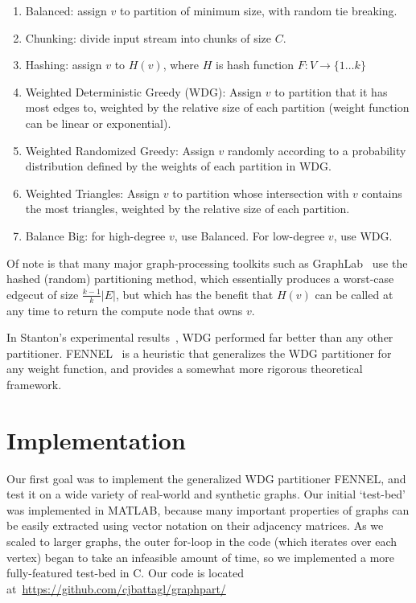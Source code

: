 \documentclass[11pt]{article}
\begin{document}
\begin{enumerate}
\item Balanced: assign $v$ to partition of minimum size, with random tie breaking.
\item Chunking: divide input stream into chunks of size $C$.
\item Hashing: assign $v$ to $H(v)$, where $H$ is hash function $F:V\to\{1\dots k\}$
\item Weighted Deterministic Greedy (WDG): Assign $v$ to partition that it has most edges to, weighted by the relative size of each partition (weight function can be linear or exponential).
\item Weighted Randomized Greedy: Assign $v$ randomly according to a probability distribution defined by the weights of each partition in WDG.
\item Weighted Triangles: Assign $v$ to partition whose intersection with $v$ contains the most triangles, weighted by the relative size of each partition.
\item Balance Big: for high-degree $v$, use Balanced. For low-degree $v$, use WDG. 
\end{enumerate}

Of note is that many major graph-processing toolkits such as GraphLab~\cite{Low:2012:DGF:2212351.2212354} use the hashed (random) partitioning method, which essentially produces a worst-case edgecut of size $\frac{k-1}{k}|E|$, but which has the benefit that $H(v)$ can be called at any time to return the compute node that owns $v$. 

In Stanton's experimental results~\cite{Stanton:2012:SGP:2339530.2339722}, WDG performed far better than any other partitioner. FENNEL~\cite{tsourakakis2012fennel} is a heuristic that generalizes the WDG partitioner for any weight function, and provides a somewhat more rigorous theoretical framework. 


\section{Implementation}
Our first goal was to implement the generalized WDG partitioner FENNEL, and test it on a wide variety of real-world and synthetic graphs. Our initial `test-bed' was implemented in MATLAB, because many important properties of graphs can be easily extracted using vector notation on their adjacency matrices. As we scaled to larger graphs, the outer for-loop in the code (which iterates over each vertex) began to take an infeasible amount of time, so we implemented a more fully-featured test-bed in C. Our code is located at~\url{https://github.com/cjbattagl/graphpart/}
\end{document}
